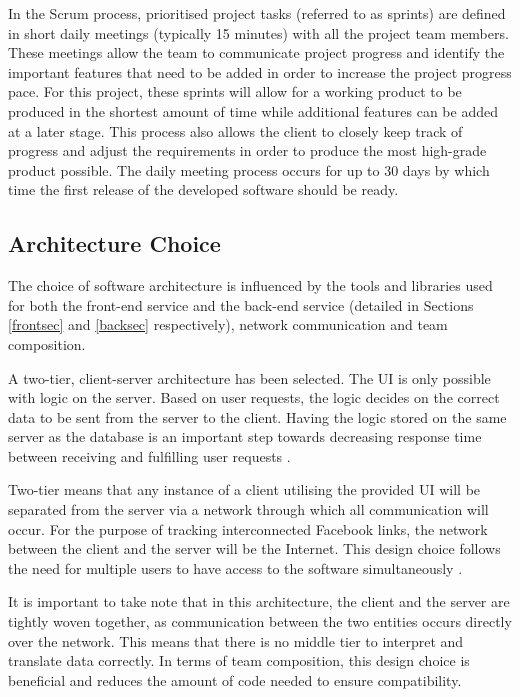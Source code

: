 \documentclass[12pt,onecolumn]{article}
\begin{document}
	In the Scrum process, prioritised project tasks (referred to as sprints) are defined in short daily meetings (typically 15 minutes) with all the project team members. These meetings allow the team to communicate project progress and identify the important features that need to be added in order to increase the project progress pace. For this project, these sprints will allow for a working product to be produced in the shortest amount of time while additional features can be  added at a later stage. This process also allows the client to closely keep track of progress and adjust the requirements in order to produce the most high-grade product possible. The daily meeting process occurs for up to 30 days by which time the first release of the developed software should be ready.   
	
	
	\subsection{Architecture Choice}
	The choice of software architecture is influenced by the tools and libraries used for both the front-end service and the back-end service (detailed in Sections \ref{frontsec} and \ref{backsec} respectively), network communication and team composition. 
	
	A two-tier, client-server architecture has been selected. The UI is only possible with logic on the server. Based on user requests, the logic decides on the correct data to be sent from the server to the client. Having the logic stored on the same server as the database is an important step towards decreasing response time between receiving and fulfilling user requests \cite{twotieradvantage}. 
	
	Two-tier means that any instance of a client utilising the provided UI will be separated from the server via a network through which all communication will occur. For the purpose of tracking interconnected Facebook links, the network between the client and the server will be the Internet. This design choice follows the need for multiple users to have access to the software simultaneously \cite{beginningsofteng}. 
	
	It is important to take note that in this architecture, the client and the server are tightly woven together, as communication between the two entities occurs directly over the network. This means that there is no middle tier to interpret and translate data correctly. In terms of team composition, this design choice is beneficial and reduces the amount of code needed to ensure compatibility.
	
\end{document}
